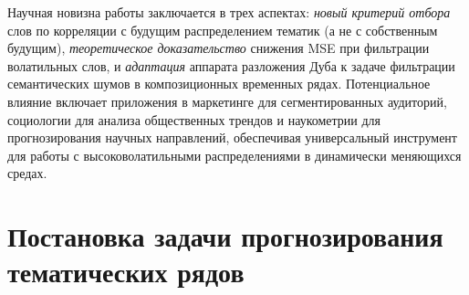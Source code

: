 \documentclass[14pt,a4paper]{article}
\begin{document}
Научная новизна работы заключается в трех аспектах: \textit{новый критерий отбора} слов по корреляции с будущим распределением тематик (а не с собственным будущим), \textit{теоретическое доказательство} снижения MSE при фильтрации волатильных слов, и \textit{адаптация} аппарата разложения Дуба к задаче фильтрации семантических шумов в композиционных временных рядах. Потенциальное влияние включает приложения в маркетинге для сегментированных аудиторий, социологии для анализа общественных трендов и наукометрии для прогнозирования научных направлений, обеспечивая универсальный инструмент для работы с высоковолатильными распределениями в динамически меняющихся средах.





\newpage
\section{Постановка задачи прогнозирования тематических рядов}
\end{document}
